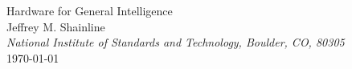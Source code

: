 \documentclass[]{article}
\begin{document}
    
\begin{center}
\LARGE{Hardware for General Intelligence}\\ 
\vspace{0.3em}
\large Jeffrey M. Shainline\\
\vspace{0.0em}
\textit{\small National Institute of Standards and Technology, Boulder, CO, 80305}\\
\vspace{0.3em}
\small \today

\begin{abstract}

\vspace{1em}
\end{abstract}

\end{center}

\begin{multicols}{2}

\setcounter{tocdepth}{4}
\setcounter{secnumdepth}{4}
\tableofcontents


















\end{multicols}
\end{document}

